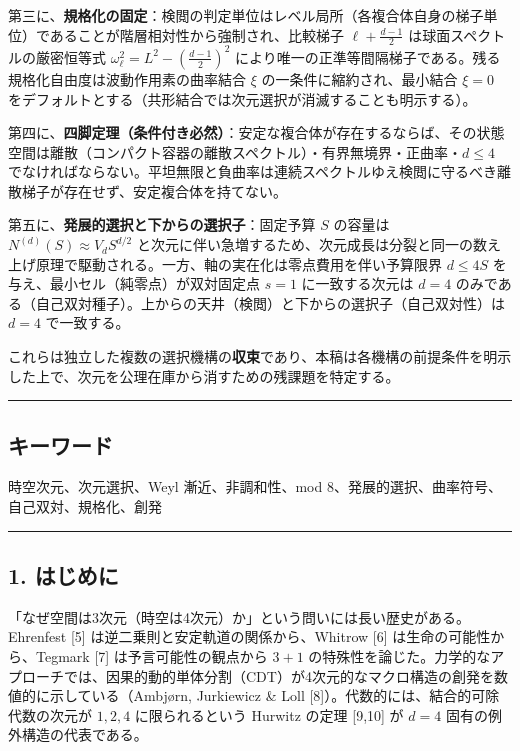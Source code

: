 \documentclass[
]{ltjsarticle}
\begin{document}
第三に、\textbf{規格化の固定}：検閲の判定単位はレベル局所（各複合体自身の梯子単位）であることが階層相対性から強制され、比較梯子
\(\ell+\tfrac{d-1}2\) は球面スペクトルの厳密恒等式
\(\omega_\ell^2=L^2-(\tfrac{d-1}2)^2\)
により唯一の正準等間隔梯子である。残る規格化自由度は波動作用素の曲率結合
\(\xi\) の一条件に縮約され、最小結合 \(\xi=0\)
をデフォルトとする（共形結合では次元選択が消滅することも明示する）。

第四に、\textbf{四脚定理（条件付き必然）}：安定な複合体が存在するならば、その状態空間は離散（コンパクト容器の離散スペクトル）・有界無境界・正曲率・\(d\le4\)
でなければならない。平坦無限と負曲率は連続スペクトルゆえ検閲に守るべき離散梯子が存在せず、安定複合体を持てない。

第五に、\textbf{発展的選択と下からの選択子}：固定予算 \(S\) の容量は
\(N^{(d)}(S)\approx V_d S^{d/2}\)
と次元に伴い急増するため、次元成長は分裂と同一の数え上げ原理で駆動される。一方、軸の実在化は零点費用を伴い予算限界
\(d\le4S\) を与え、最小セル（純零点）が双対固定点 \(s=1\)
に一致する次元は \(d=4\)
のみである（自己双対種子）。上からの天井（検閲）と下からの選択子（自己双対性）は
\(d=4\) で一致する。

これらは独立した複数の選択機構の\textbf{収束}であり、本稿は各機構の前提条件を明示した上で、次元を公理在庫から消すための残課題を特定する。

\begin{center}\rule{0.5\linewidth}{0.5pt}\end{center}

\subsection{キーワード}\label{ux30adux30fcux30efux30fcux30c9}

時空次元、次元選択、Weyl 漸近、非調和性、mod
8、発展的選択、曲率符号、自己双対、規格化、創発

\begin{center}\rule{0.5\linewidth}{0.5pt}\end{center}

\subsection{1. はじめに}\label{ux306fux3058ux3081ux306b}

「なぜ空間は3次元（時空は4次元）か」という問いには長い歴史がある。Ehrenfest
{[}5{]} は逆二乗則と安定軌道の関係から、Whitrow {[}6{]}
は生命の可能性から、Tegmark {[}7{]} は予言可能性の観点から \(3{+}1\)
の特殊性を論じた。力学的なアプローチでは、因果的動的単体分割（CDT）が4次元的なマクロ構造の創発を数値的に示している（Ambjørn,
Jurkiewicz \& Loll {[}8{]}）。代数的には、結合的可除代数の次元が
\(1,2,4\) に限られるという Hurwitz の定理 {[}9,10{]} が \(d=4\)
固有の例外構造の代表である。
\end{document}
